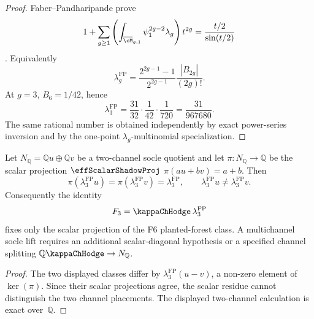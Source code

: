 \begin{proof}
Faber--Pandharipande prove
\[
 1+\sum_{g\ge 1}
 \left(\int_{\overline{\cM}_{g,1}}\psi_1^{2g-2}\lambda_g\right)t^{2g}
 =
 \frac{t/2}{\sin(t/2)}
\]
\cite{FP00}. Equivalently
\[
 \lambda_g^{\mathrm{FP}}
 =
 \frac{2^{2g-1}-1}{2^{2g-1}}
 \frac{|B_{2g}|}{(2g)!}.
\]
At \(g=3\), \(B_6=1/42\), hence
\[
 \lambda_3^{\mathrm{FP}}
 =
 \frac{31}{32}\cdot\frac{1}{42}\cdot\frac{1}{720}
 =
 \frac{31}{967680}.
\]
The same rational number is obtained independently by exact
power-series inversion and by the one-point
\(\lambda_g\)-multinomial specialization.
\end{proof}

\begin{proposition}
\ClaimStatusProvedHere
Let \(N_{\mathbb Q}=\mathbb Q u\oplus\mathbb Q v\) be a two-channel
socle quotient and let
\(\pi:N_{\mathbb Q}\to\mathbb Q\) be the scalar projection
\(\effScalarShadowProj\)
\(\pi(a u+b v)=a+b\). Then
\[
 \pi(\lambda_3^{\mathrm{FP}}u)
 =
 \pi(\lambda_3^{\mathrm{FP}}v)
 =
 \lambda_3^{\mathrm{FP}},
 \qquad
 \lambda_3^{\mathrm{FP}}u\neq \lambda_3^{\mathrm{FP}}v .
\]
Consequently the identity
\[
 F_3=\kappaChHodge\,\lambda_3^{\mathrm{FP}}
\]
fixes only the scalar projection of the F6 planted-forest class. A
multichannel socle lift requires an additional scalar-diagonal
hypothesis or a specified channel splitting
\(\mathbb Q\kappaChHodge\to N_{\mathbb Q}\).
\end{proposition}

\begin{proof}
The two displayed classes differ by
\(\lambda_3^{\mathrm{FP}}(u-v)\), a non-zero element of
\(\ker(\pi)\). Since their scalar projections agree, the scalar
residue cannot distinguish the two channel placements. The displayed
two-channel calculation is exact over~\(\mathbb Q\).
\end{proof}

